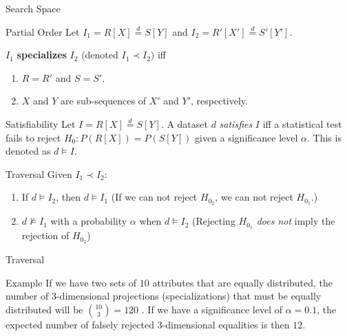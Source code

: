 \documentclass[10pt]{beamer}
\newcommand{\eqdist}{\stackrel{d}{=}}
\begin{document}
\begin{frame}{Search Space}
    \begin{block}{Partial Order}
        Let $I_1 = R[X] \eqdist S[Y]$ and $I_2 = R'[X'] \eqdist S'[Y']$.
        
        $I_1$ \textbf{specializes} $I_2$ (denoted $I_1 \prec I_2)$ iff
        \begin{enumerate}
            \item $R = R'$ and $S = S'$.
            \item $X$ and $Y$ are sub-sequences of $X'$ and $Y'$, respectively.
        \end{enumerate}
    \end{block}

    \begin{block}{Satisfiability}
    Let $I = R[X] \eqdist S[Y]$.
    A dataset $d$ \emph{satisfies} $I$ iff  a statistical test fails to reject $H_0: P(R[X]) = P(S[Y])$
    given a significance level $\alpha$.
    This is denoted as $d \models I$.
    \end{block}
\end{frame}

\begin{frame}{Traversal}
    Given $I_1 \prec I_2$:
    
    \begin{enumerate}
        \item If $d \models I_2$, then $d \models I_1$ (If we can not reject $H_{0_2}$, we can not reject $H_{0_1}$.)
        \item $d \not\models I_1$ with a probability $\alpha$ when $d \models I_2$
            (Rejecting $H_{0_1}$ \emph{does not} imply the rejection of $H_{0_2}$)
    \end{enumerate}
\end{frame}

\begin{frame}{Traversal}
    \begin{exampleblock}{Example}
    \smallskip
    If we have two sets of $10$ attributes that are equally distributed, the number of
    3-dimensional projections (specializations) that must be equally distributed will be $\binom{10}{3} = 120$ .
    If we have a significance level of $\alpha = 0.1$, the expected number of
    falsely rejected 3-dimensional equalities is then $12$.
    \end{exampleblock}
\end{frame}
\end{document}
